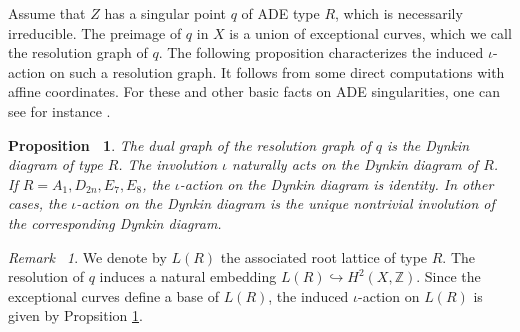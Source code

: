 \documentclass[12pt,reqno,a4paper]{amsart}
\newtheorem{prop}[thm]{Proposition~}
\theoremstyle{remark}
\newtheorem{rmk}[thm]{Remark~}
\theoremstyle{definition}
\newcommand{\ZZ}{\mathbb{Z}}
\begin{document}

Assume that $Z$ has a singular point $q$ of ADE type $R$, which is necessarily irreducible.
The preimage of $q$ in $X$ is a union of exceptional curves, which we call the resolution graph of $q$. 
The following proposition characterizes the induced $\iota$-action on such a resolution graph. It follows from some direct computations with affine coordinates. For these and other basic facts on ADE singularities, one can see for instance \cite[III, \S 7]{barth2004compact}.
\begin{prop}
\label{prop: iota-action on resolution graph/base}
  The dual graph of the resolution graph of $q$ is the Dynkin diagram of type $R$. 
  The involution $\iota$ naturally acts on the Dynkin diagram of $R$.
  If $R=A_1, D_{2n}, E_7, E_8$, the $\iota$-action on the Dynkin diagram is identity. 
  In other cases, the $\iota$-action on the Dynkin diagram is the unique nontrivial involution of the corresponding Dynkin diagram.
\end{prop}
\begin{rmk}
\label{rmk: iota-action on L(R)}
    We denote by $L(R)$ the associated root lattice of type $R$.
    The resolution of $q$ induces a natural embedding $L(R)\hookrightarrow H^2(X,\ZZ)$.
    Since the exceptional curves define a base of $L(R)$, the induced $\iota$-action on $L(R)$ is given by Propsition \ref{prop: iota-action on resolution graph/base}.
\end{rmk}
\end{document}
